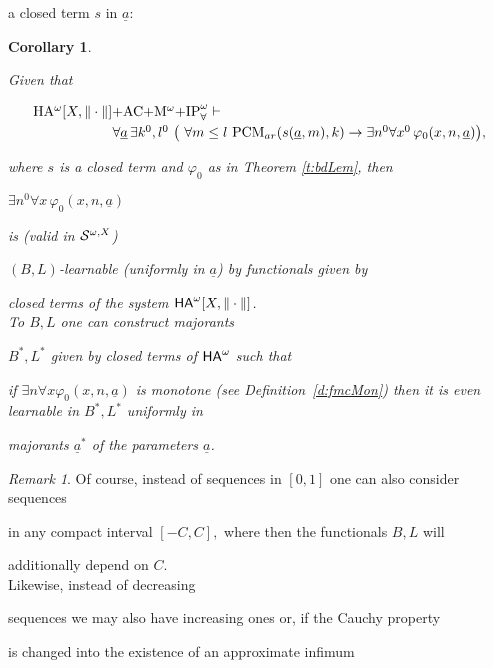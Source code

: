 \documentclass[1p]{elsarticle}
\newcommand{\usftext}[1]{\textsf{\upshape #1}}
\newcommand{\ba}{\begin{array}} \newcommand{\ea}{\end{array}}
\newcommand{\ha}{\ensuremath{{\usftext{HA}}^\omega}} %
\newcommand{\tup}{\underline} %
\theoremstyle{plain}
\newtheorem{cor}[thm]{Corollary}
\theoremstyle{definition}
\theoremstyle{remark}
\newtheorem*{remark}{Remark}
\renewcommand{\phi}{\varphi}
\theoremstyle{definition}
\begin{document}
{a closed term $s$ in $\underline{a}:$

\begin{cor} \label{cor.2.11}

Given that 

\[\ba{l} \mbox{\rm HA$^{\omega}[X,\|\cdot\|]+$AC$+$M$^{\omega}+

$IP}^{\omega}_{\forall}\vdash \\[1mm] \hspace*{2cm}  

\forall \underline{a}\,\exists k^0 ,l^0\ \big( 

\ \forall m \le l\ \mbox{\rm PCM}_{ar}(s(\underline{a},m),k)

 \rightarrow \exists n^0\forall x^0\,\varphi_0(x,n,\underline{a})\big), 

\ea \] 

where $s$ is a closed term and $\varphi_0$ as in Theorem \ref{t:bdLem}, then 

$\exists n^0\forall x\,\varphi_0(x,n,\underline{a})$ 

is (valid in ${\cal S}^{\omega,X}$) 

$(B,L)$-learnable (uniformly in $\underline{a}$) by functionals given by 

closed terms of the system $\ha[X,\|\cdot\|]$.\\

To $B,L$ one can construct majorants 

$B^*,L^*$ given by closed terms of $\ha$ such that 

if $\exists n\forall x \phi_0(x,n,\tup a)$ is monotone (see Definition~\ref{d:fmcMon}) then it is even learnable in $B^*,L^*$ uniformly in

majorants $\underline{a}^*$ of the parameters $\underline{a}$.

\end{cor}   

\begin{remark}

Of course, instead of sequences in $[0,1]$ one can also consider sequences 

in any compact interval $[-C,C],$ where then the functionals $B,L$ will 

additionally depend on $C.$ \\[1mm] Likewise, instead of decreasing 

sequences we may also have increasing ones or, if the Cauchy property 

is changed into the existence of an approximate infimum 


\end{remark}}
\end{document}
